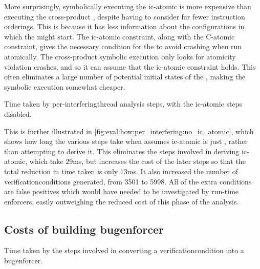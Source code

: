 More surprisingly, symbolically executing the \gls{ic-atomic}
{\StateMachine} is more expensive than executing the cross-product
{\StateMachine}, despite having to consider far fewer instruction
orderings.  This is because it has less information about the
configurations in which the {\StateMachines} might start.  The
\gls{ic-atomic} constraint, along with the C-atomic constraint, gives
the necessary condition for the {\StateMachines} to avoid crashing
when run atomically.  The cross-product symbolic execution only looks
for atomicity violation crashes, and so it can assume that the
\gls{ic-atomic} constraint holds.  This often eliminates a large
number of potential initial states of the {\StateMachines}, making the
symbolic execution somewhat cheaper.

\begin{sanefig}
  \centerline{
  }
  \caption{Time taken by per-\gls{interferingthread} analysis steps,
    with the \gls{ic-atomic} steps disabled.}
  \label{fig:eval:how:per_interfering:no_ic_atomic}
\end{sanefig}

This is further illustrated in
\autoref{fig:eval:how:per_interfering:no_ic_atomic}, which shows how
long the various steps take when {\technique} assumes \gls{ic-atomic}
is just \true, rather than attempting to derive it.  This eliminates
the steps involved in deriving \gls{ic-atomic}, which take 29ms, but
increases the cost of the later steps so that the total reduction in
time taken is only 13ms.  It also increased the number of
\glspl{verificationcondition} generated, from 3501 to 5998.  All of
the extra conditions are false positives which would have needed to be
investigated by run-time enforcers, easily outweighing the reduced
cost of this phase of the analysis.


\subsection{Costs of building \gls{bugenforcer}}

\begin{sanefig}
  \centerline{
  }
  \caption{Time taken by the steps involved in converting a
    \gls{verificationcondition} into a \gls{bugenforcer}.}
  \label{fig:eval:how:build_enforcer}
\end{sanefig}


